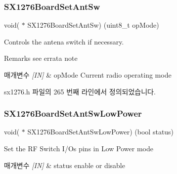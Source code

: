 \mbox{\label{structs_board_callback_aff31b16510fde832787af55c87e9d1b7}} 
\subsubsection{\texorpdfstring{S\+X1276\+Board\+Set\+Ant\+Sw}{SX1276BoardSetAntSw}}
{\footnotesize\ttfamily void( $\ast$ S\+X1276\+Board\+Set\+Ant\+Sw) (uint8\+\_\+t op\+Mode)}



Controls the antena switch if necessary. 

\begin{DoxyRemark}{Remarks}
see errata note
\end{DoxyRemark}

\begin{DoxyParams}{매개변수}
{\em \mbox{[}\+I\+N\mbox{]}} & op\+Mode Current radio operating mode \\
\hline
\end{DoxyParams}


sx1276.\+h 파일의 265 번째 라인에서 정의되었습니다.

\mbox{\label{structs_board_callback_a05048f8c28130f39b11552ccd1668125}} 
\subsubsection{\texorpdfstring{S\+X1276\+Board\+Set\+Ant\+Sw\+Low\+Power}{SX1276BoardSetAntSwLowPower}}
{\footnotesize\ttfamily void( $\ast$ S\+X1276\+Board\+Set\+Ant\+Sw\+Low\+Power) (bool status)}



Set the RF Switch I/\+Os pins in Low Power mode 


\begin{DoxyParams}{매개변수}
{\em \mbox{[}\+I\+N\mbox{]}} & status enable or disable \\
\hline
\end{DoxyParams}



